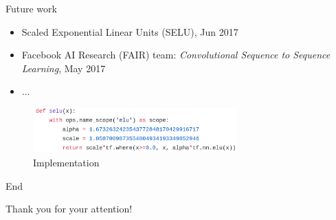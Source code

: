 \documentclass[10pt]{beamer}
\begin{document}
\begin{frame}[fragile]{Future work}
	\begin{itemize}
		\item<1-> Scaled Exponential Linear Units (SELU), Jun 2017
		\item<3-> Facebook AI Research (FAIR) team: \textit{Convolutional Sequence to Sequence Learning}, May 2017
		\item<4-> ...
	\end{itemize}
	
	 {
		\begin{figure}
			\caption{Implementation}
			\begin{center}
				\includegraphics[width=0.7\textwidth]{./imgs/selu_tf.png}%
				
			\end{center}
		\end{figure}
	}
\end{frame}

\begin{frame}[fragile]{End}
	\vfill
	\begin{center}  
		Thank you for your attention!
	\end{center}
	
	\vfill
\end{frame}
\end{document}
